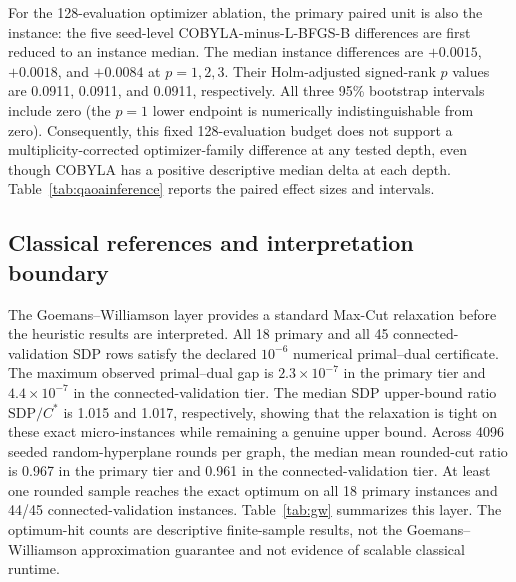 \documentclass[5p,times]{elsarticle}
\begin{document}
For the 128-evaluation optimizer ablation, the primary paired unit is also the instance: the five seed-level COBYLA-minus-L-BFGS-B differences are first reduced to an instance median. The median instance differences are $+0.0015$, $+0.0018$, and $+0.0084$ at $p=1,2,3$. Their Holm-adjusted signed-rank $p$ values are 0.0911, 0.0911, and 0.0911, respectively. All three 95\% bootstrap intervals include zero (the $p=1$ lower endpoint is numerically indistinguishable from zero). Consequently, this fixed 128-evaluation budget does not support a multiplicity-corrected optimizer-family difference at any tested depth, even though COBYLA has a positive descriptive median delta at each depth. Table~\ref{tab:qaoainference} reports the paired effect sizes and intervals.

\begin{table}[t]
\centering
\caption{Instance-clustered inferential checks for QAOA depth and optimizer family. Five optimizer starts are collapsed within each of the 18 fixed primary benchmark instances before testing. Confidence intervals resample instances; $p$ values are Holm-adjusted within the three depth contrasts or the three optimizer contrasts.}
\label{tab:qaoainference}

\end{table}

\subsection{Classical references and interpretation boundary}
The Goemans--Williamson layer provides a standard Max-Cut relaxation before the heuristic results are interpreted. All 18 primary and all 45 connected-validation SDP rows satisfy the declared $10^{-6}$ numerical primal--dual certificate. The maximum observed primal--dual gap is $2.3\times10^{-7}$ in the primary tier and $4.4\times10^{-7}$ in the connected-validation tier. The median SDP upper-bound ratio $\mathrm{SDP}/C^*$ is 1.015 and 1.017, respectively, showing that the relaxation is tight on these exact micro-instances while remaining a genuine upper bound. Across 4096 seeded random-hyperplane rounds per graph, the median mean rounded-cut ratio is 0.967 in the primary tier and 0.961 in the connected-validation tier. At least one rounded sample reaches the exact optimum on all 18 primary instances and 44/45 connected-validation instances. Table~\ref{tab:gw} summarizes this layer. The optimum-hit counts are descriptive finite-sample results, not the Goemans--Williamson approximation guarantee and not evidence of scalable classical runtime.
\end{document}
